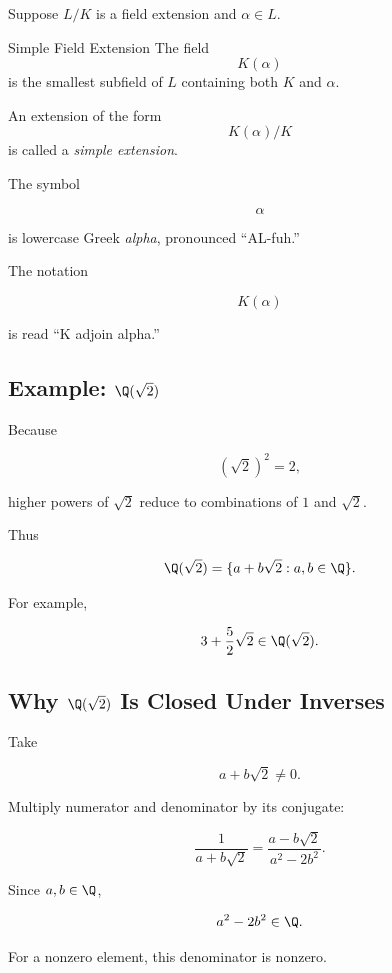 Suppose \(L/K\) is a field extension and \(\alpha\in L\).

\begin{definitionbox}{Simple Field Extension}
The field
\[ K(\alpha) \]
is the smallest subfield of \(L\) containing both \(K\) and \(\alpha\).

An extension of the form
\[ K(\alpha)/K \]
is called a \emph{simple extension}.
\end{definitionbox}

The symbol

\[ \alpha \]

is lowercase Greek \emph{alpha}, pronounced ``AL-fuh.''

The notation

\[ K(\alpha) \]

is read ``K adjoin alpha.''

\subsection{Example: \(\Q(\sqrt2)\)}
\label{subsec:q-sqrt2}

Because

\[ (\sqrt2)^2=2, \]

higher powers of \(\sqrt2\) reduce to combinations of \(1\) and \(\sqrt2\).

Thus

\[ \Q(\sqrt2)=\{a+b\sqrt2:a,b\in\Q\}. \]

For example,

\[ 3+\frac52\sqrt2\in\Q(\sqrt2). \]

\subsection{Why \(\Q(\sqrt2)\) Is Closed Under Inverses}
\label{subsec:q-sqrt2-inverses}

Take

\[ a+b\sqrt2\neq0. \]

Multiply numerator and denominator by its conjugate:

\[ \frac{1}{a+b\sqrt2}=\frac{a-b\sqrt2}{a^2-2b^2}. \]

Since \(a,b\in\Q\),

\[ a^2-2b^2\in\Q. \]

For a nonzero element, this denominator is nonzero.

